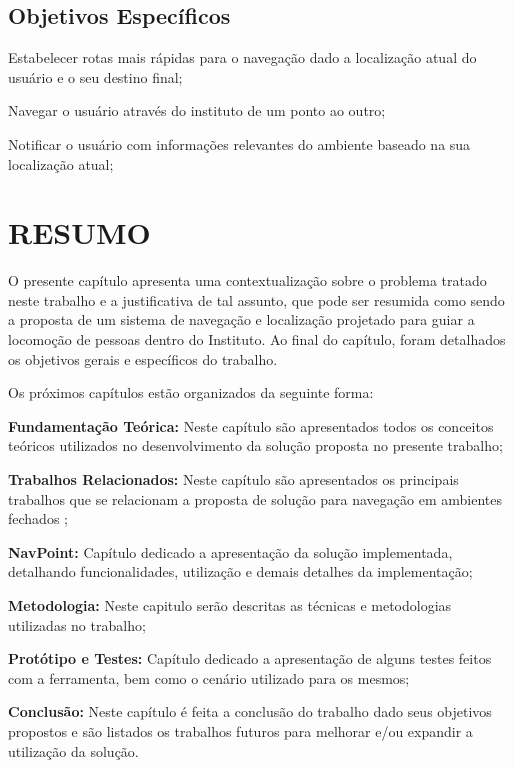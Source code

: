 \subsection{Objetivos Específicos}
\begin{lista}
  \item Estabelecer rotas mais rápidas para o navegação dado a localização atual do usuário e o seu destino final;
  \item Navegar o usuário através do instituto de um ponto ao outro;
  \item Notificar o usuário com informações relevantes do ambiente baseado na sua localização atual;
\end{lista}

\section*{RESUMO}
O presente capítulo apresenta uma contextualização sobre o problema tratado neste
trabalho e a justificativa de tal assunto, que pode ser resumida como sendo a proposta de um sistema de navegação e localização projetado para guiar a locomoção de pessoas dentro do Instituto.  Ao final do
capítulo, foram detalhados os objetivos gerais e específicos do trabalho.

Os próximos capítulos estão organizados da seguinte forma:

\begin{lista}
  \item \textbf{Fundamentação Teórica:} Neste capítulo são apresentados todos os conceitos teóricos utilizados no desenvolvimento da solução proposta no presente trabalho;
 \item \textbf{Trabalhos Relacionados:} Neste capítulo são apresentados os principais trabalhos que se relacionam a proposta de solução para navegação em ambientes fechados ;
  \item \textbf{NavPoint:} Capítulo dedicado a apresentação da solução implementada, detalhando funcionalidades, utilização e demais detalhes da implementação;
 \item \textbf{Metodologia:} Neste capitulo serão descritas as técnicas e metodologias utilizadas no trabalho;
 \item \textbf{Protótipo e Testes:} Capítulo dedicado a apresentação de alguns testes feitos com a ferramenta, bem como o cenário utilizado para os mesmos;
  \item \textbf{Conclusão:} Neste capítulo é feita a conclusão do trabalho dado seus objetivos propostos e são listados os trabalhos futuros para melhorar e/ou expandir a utilização da solução.
\end{lista}


